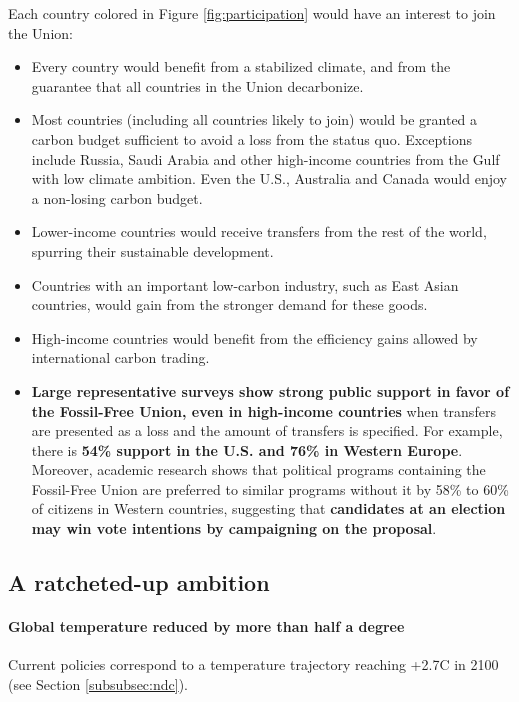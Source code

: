 \documentclass[12pt,english]{article}
\begin{document}
Each country colored in Figure \ref{fig:participation} would have an interest to join the Union: 
\begin{itemize}
  \item Every country would benefit from a stabilized climate, and from the guarantee that all countries in the Union decarbonize.
  \item Most countries (including all countries likely to join) would be granted a carbon budget sufficient to avoid a loss from the status quo. Exceptions include Russia, Saudi Arabia and other high-income countries from the Gulf with low climate ambition. Even the U.S., Australia and Canada would enjoy a non-losing carbon budget.
  \item Lower-income countries would receive transfers from the rest of the world, spurring their sustainable development.
  \item Countries with an important low-carbon industry, such as East Asian countries, would gain from the stronger demand for these goods.
  \item High-income countries would benefit from the efficiency gains allowed by international carbon trading.
  \item \textbf{Large representative surveys show strong public support in favor of the Fossil-Free Union, even in high-income countries} when transfers are presented as a loss and the amount of transfers is specified. For example, there is\textbf{ 54\% support in the U.S. and 76\% in Western Europe}.\cite{fabre_international_2023} %
  Moreover, academic research shows that political programs containing the Fossil-Free Union are preferred to similar programs without it by 58\% to 60\% of citizens in Western countries, suggesting that \textbf{candidates at an election may win vote intentions by campaigning on the proposal}.\cite{fabre_international_2023}
\end{itemize}

\subsection{A ratcheted-up ambition\label{subsec:ambition}}

\paragraph{Global temperature reduced by more than half a degree}
Current policies correspond to a temperature trajectory reaching +2.7\textdegree{}C in 2100 (see Section \ref{subsubsec:ndc}). 
\end{document}
